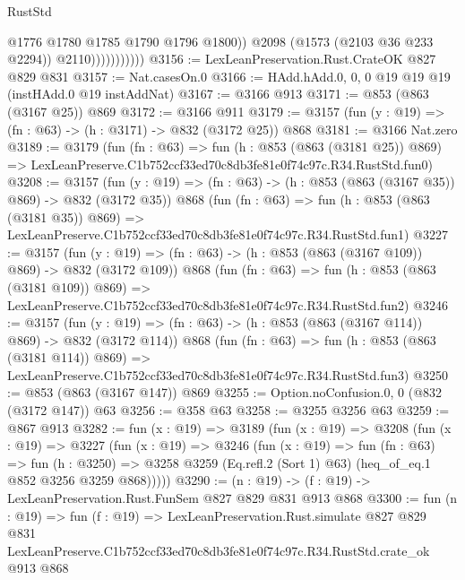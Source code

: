 \begin{lexlean}{RustStd}
\begin{coremodule}
                              @1776
                              @1780
                              @1785
                              @1790
                              @1796
                              @1800))
                          @2098
                          (@1573 (@2103 @36 @233 @2294))
                          @2110)))))))))))
@3156 := LexLeanPreservation.Rust.CrateOK @827 @829 @831
@3157 := Nat.casesOn.{0}
@3166 := HAdd.hAdd.{0, 0, 0} @19 @19 @19 (instHAdd.{0} @19 instAddNat)
@3167 := @3166 @913
@3171 := @853 (@863 (@3167 @25)) @869
@3172 := @3166 @911
@3179 := @3157 (fun (y : @19) => (fn : @63) -> (h : @3171) -> @832 (@3172 @25)) @868
@3181 := @3166 Nat.zero
@3189 := @3179
    (fun (fn : @63) =>
    fun (h : @853 (@863 (@3181 @25)) @869) =>
    LexLeanPreserve.C1b752ccf33ed70c8db3fe81e0f74c97c.R34.RustStd.fun0)
@3208 := @3157
    (fun (y : @19) => (fn : @63) -> (h : @853 (@863 (@3167 @35)) @869) -> @832 (@3172 @35))
    @868
    (fun (fn : @63) =>
    fun (h : @853 (@863 (@3181 @35)) @869) =>
    LexLeanPreserve.C1b752ccf33ed70c8db3fe81e0f74c97c.R34.RustStd.fun1)
@3227 := @3157
    (fun (y : @19) => (fn : @63) -> (h : @853 (@863 (@3167 @109)) @869) -> @832 (@3172 @109))
    @868
    (fun (fn : @63) =>
    fun (h : @853 (@863 (@3181 @109)) @869) =>
    LexLeanPreserve.C1b752ccf33ed70c8db3fe81e0f74c97c.R34.RustStd.fun2)
@3246 := @3157
    (fun (y : @19) => (fn : @63) -> (h : @853 (@863 (@3167 @114)) @869) -> @832 (@3172 @114))
    @868
    (fun (fn : @63) =>
    fun (h : @853 (@863 (@3181 @114)) @869) =>
    LexLeanPreserve.C1b752ccf33ed70c8db3fe81e0f74c97c.R34.RustStd.fun3)
@3250 := @853 (@863 (@3167 @147)) @869
@3255 := Option.noConfusion.{0, 0} (@832 (@3172 @147)) @63
@3256 := @358 @63
@3258 := @3255 @3256 @63
@3259 := @867 @913
@3282 := fun (x : @19) =>
  @3189
    (fun (x : @19) =>
    @3208
      (fun (x : @19) =>
      @3227
        (fun (x : @19) =>
        @3246
          (fun (x : @19) =>
          fun (fn : @63) =>
          fun (h : @3250) =>
          @3258 @3259 (Eq.refl.{2} (Sort 1) @63) (heq_of_eq.{1} @852 @3256 @3259 @868)))))
@3290 := (n : @19) -> (f : @19) -> LexLeanPreservation.Rust.FunSem @827 @829 @831 @913 @868
@3300 := fun (n : @19) =>
  fun (f : @19) =>
  LexLeanPreservation.Rust.simulate
    @827
    @829
    @831
    LexLeanPreserve.C1b752ccf33ed70c8db3fe81e0f74c97c.R34.RustStd.crate_ok
    @913
    @868
\end{coremodule}
\end{lexlean}
